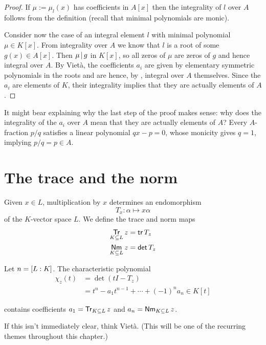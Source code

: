 \begin{proof}
  If $\mu := \mu_l(x)$ has coefficients in $A[x]$ then the integrality of $l$
  over $A$ follows from the definition (recall that minimal polynomials are
  monic). 
  
  \medskip\noindent Consider now the case of an integral element $l$ with
  minimal polynomial $\mu \in K[x]$. From integrality over $A$ we know that $l$
  is a root of some $g(x) \in A[x]$. Then $\mu \mathop{|} g$ in $K[x]$, so all
  zeros of $\mu$ are zeros of $g$ and hence integral over $A$.  \npar By
  Viet\`a, the coefficients $a_i$ are given by elementary symmetric polynomials
  in the roots and are hence, by , integral
  over $A$ themselves. Since the $a_i$ are elements of $K$, their integrality
  implies that they are actually elements of $A$.
\end{proof}

\begin{remark}
  It might bear explaining why the last step of the proof makes sense: why does
  the integrality of the $a_i$ over $A$ mean that they are actually elements of
  $A$? Every $A$-fraction $p/q$ satisfies a linear polynomial $qx-p = 0$, whose
  monicity gives $q = 1$, implying $p/q = p \in A$. 
\end{remark}

\section{The trace and the norm}

Given $x \in L$, multiplication by $x$ determines an endomorphism
\[ T_x : \alpha \mapsto x\alpha \] of the $K$-vector space $L$. We define the
trace and norm maps
\begin{align*}
  {\operatorname*{\mathsf{Tr}}_{K \subseteq L}}\,z &= \operatorname{{\mathsf{tr}}} T_z\\
  {\operatorname*{\mathsf{Nm}}_{K \subseteq L}}\,z &= \operatorname{{\mathsf{det}}} T_z
\end{align*}

Let $n = [L : K]$. The characteristic polynomial
\begin{align*}
  \chi_z(t) &= \det (tI - T_z)\\
            &= t^n - a_1t^{n-1} + \cdots + (-1)^n a_n \in K[t]
\end{align*}

contains coefficients $a_1 = {\operatorname*{\mathsf{Tr}}_{K \subseteq L}}\,z$ and $a_n = {\operatorname*{\mathsf{Nm}}_{K \subseteq L}}\,z$.

\begin{remark}
  If this isn't immediately clear, think Viet\`a. (This will be one of the
  recurring themes throughout this chapter.)
\end{remark}


